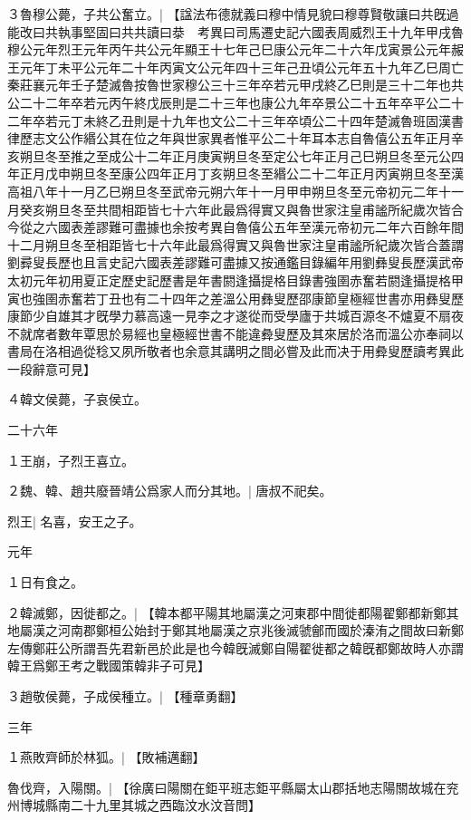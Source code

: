 ３魯穆公薨，子共公奮立。|{
		【諡法布德就義曰穆中情見貌曰穆尊賢敬讓曰共旣過能改曰共執事堅固曰共共讀曰㳟　考異曰司馬遷史記六國表周威烈王十九年甲戌魯穆公元年烈王元年丙午共公元年顯王十七年己巳康公元年二十六年戊寅景公元年赧王元年丁未平公元年二十年丙寅文公元年四十三年己丑頃公元年五十九年乙巳周亡秦莊襄元年壬子楚滅魯按魯世家穆公三十三年卒若元甲戌終乙巳則是三十二年也共公二十二年卒若元丙午終戊辰則是二十三年也康公九年卒景公二十五年卒平公二十二年卒若元丁未終乙丑則是十九年也文公二十三年卒頃公二十四年楚滅魯班固漢書律歷志文公作緡公其在位之年與世家異者惟平公二十年耳本志自魯僖公五年正月辛亥朔旦冬至推之至成公十二年正月庚寅朔旦冬至定公七年正月己巳朔旦冬至元公四年正月戊申朔旦冬至康公四年正月丁亥朔旦冬至緡公二十二年正月丙寅朔旦冬至漢高祖八年十一月乙巳朔旦冬至武帝元朔六年十一月甲申朔旦冬至元帝初元二年十一月癸亥朔旦冬至共間相距皆七十六年此最爲得實又與魯世家注皇甫謐所紀歲次皆合今從之六國表差謬難可盡據也余按考異自魯僖公五年至漢元帝初元二年六百餘年間十二月朔旦冬至相距皆七十六年此最爲得實又與魯世家注皇甫謐所紀歲次皆合蓋謂劉彛叟長歷也且言史記六國表差謬難可盡據又按通鑑目錄編年用劉彝叟長歷漢武帝太初元年初用夏正定歷史記歷書是年書閼逢攝提格目錄書強圉赤奮若閼逢攝提格甲寅也強圉赤奮若丁丑也有二十四年之差溫公用彝叟歷邵康節皇極經世書亦用彝叟歷康節少自雄其才旣學力慕高遠一見李之才遂從而受學廬于共城百源冬不爐夏不扇夜不就席者數年覃思於易經也皇極經世書不能違彜叟歷及其來居於洛而溫公亦奉祠以書局在洛相過從稔又夙所敬者也余意其講明之間必嘗及此而决于用彜叟歷讀考異此一段辭意可見】}

４韓文侯薨，子哀侯立。


二十六年

１王崩，子烈王喜立。

２魏、韓、趙共廢晉靖公爲家人而分其地。|{
	唐叔不祀矣。
	}


烈王|{
	名喜，安王之子。
	}


	元年

１日有食之。

２韓滅鄭，因徙都之。|{
	【韓本都平陽其地屬漢之河東郡中間徙都陽翟鄭都新鄭其地屬漢之河南郡鄭桓公始封于鄭其地屬漢之京兆後滅虢鄶而國於溱洧之間故曰新鄭左傳鄭莊公所謂吾先君新邑於此是也今韓旣滅鄭自陽翟徙都之韓旣都鄭故時人亦謂韓王爲鄭王考之戰國策韓非子可見】}

３趙敬侯薨，子成侯種立。|{
	【種章勇翻】}

	三年

１燕敗齊師於林狐。|{
	【敗補邁翻】}

魯伐齊，入陽關。|{
	【徐廣曰陽關在鉅平班志鉅平縣屬太山郡括地志陽關故城在兖州博城縣南二十九里其城之西臨汶水汶音問】}

